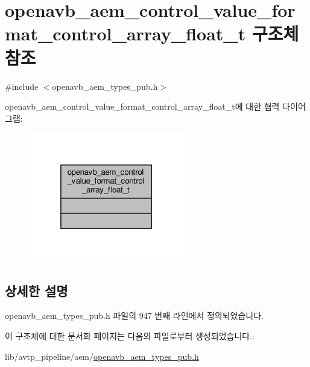 \hypertarget{structopenavb__aem__control__value__format__control__array__float__t}{}\section{openavb\+\_\+aem\+\_\+control\+\_\+value\+\_\+format\+\_\+control\+\_\+array\+\_\+float\+\_\+t 구조체 참조}
\label{structopenavb__aem__control__value__format__control__array__float__t}


{\ttfamily \#include $<$openavb\+\_\+aem\+\_\+types\+\_\+pub.\+h$>$}



openavb\+\_\+aem\+\_\+control\+\_\+value\+\_\+format\+\_\+control\+\_\+array\+\_\+float\+\_\+t에 대한 협력 다이어그램\+:
\nopagebreak
\begin{figure}[H]
\begin{center}
\leavevmode
\includegraphics[width=193pt]{structopenavb__aem__control__value__format__control__array__float__t__coll__graph}
\end{center}
\end{figure}


\subsection{상세한 설명}


openavb\+\_\+aem\+\_\+types\+\_\+pub.\+h 파일의 947 번째 라인에서 정의되었습니다.



이 구조체에 대한 문서화 페이지는 다음의 파일로부터 생성되었습니다.\+:\begin{DoxyCompactItemize}
\item 
lib/avtp\+\_\+pipeline/aem/\hyperlink{openavb__aem__types__pub_8h}{openavb\+\_\+aem\+\_\+types\+\_\+pub.\+h}\end{DoxyCompactItemize}
